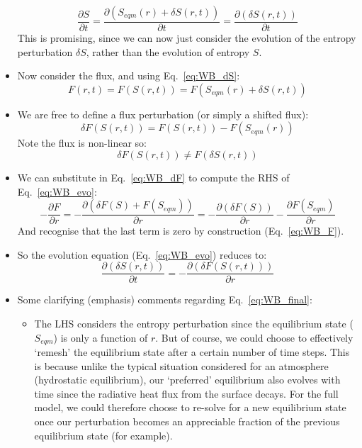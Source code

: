 \begin{itemize}
\begin{equation}
\frac{\partial S}{\partial t} = \frac{\partial (S_{eqm}(r)+\delta S(r,t))}{\partial t} = \frac{\partial (\delta S(r,t))}{\partial t}
\end{equation}
This is promising, since we can now just consider the evolution of the entropy perturbation $\delta S$, rather than the evolution of entropy $S$.
\item Now consider the flux, and using Eq.~\ref{eq:WB_dS}:
\begin{equation}
F(r,t) = F(S(r,t)) = F(S_{eqm}(r)+\delta S(r,t))
\end{equation}
\item We are free to define a flux perturbation (or simply a shifted flux):
\begin{equation}
\delta F(S(r,t)) = F(S(r,t)) - F(S_{eqm}(r))
\label{eq:WB_dF}
\end{equation}
Note the flux is non-linear so:
\begin{equation}
\delta F(S(r,t)) \neq F(\delta S(r,t))
\end{equation}
\item We can substitute in Eq.~\ref{eq:WB_dF} to compute the RHS of Eq.~\ref{eq:WB_evo}:
\begin{equation}
- \frac{\partial F}{\partial r} = -\frac{\partial (\delta F(S)+F(S_{eqm}))}{\partial r} = -\frac{\partial (\delta F(S))}{\partial r} - \frac{\partial F(S_{eqm})}{\partial r}
\end{equation}
And recognise that the last term is zero by construction (Eq.~\ref{eq:WB_F}).
\item So the evolution equation (Eq.~\ref{eq:WB_evo}) reduces to:
\begin{equation}
\frac{\partial (\delta S(r,t))}{\partial t} = -\frac{\partial (\delta F(S(r,t)))}{\partial r}
\label{eq:WB_final}
\end{equation}
\item Some clarifying (emphasis) comments regarding Eq.~\ref{eq:WB_final}:
\begin{itemize}
\item The LHS considers the entropy perturbation since the equilibrium state ($S_{eqm}$) is only a function of $r$.  But of course, we could choose to effectively `remesh' the equilibrium state after a certain number of time steps.  This is because unlike the typical situation considered for an atmosphere (hydrostatic equilibrium), our `preferred' equilibrium also evolves with time since the radiative heat flux from the surface decays.  For the full model, we could therefore choose to re-solve for a new equilibrium state once our perturbation becomes an appreciable fraction of the previous equilibrium state (for example).

\end{itemize}
\end{itemize}
